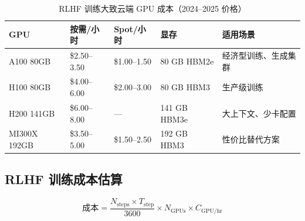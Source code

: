 \begin{table}[ht!]
\centering\small
\caption{RLHF 训练大致云端 GPU 成本（2024--2025 价格）}
\begin{tabularx}{0.88\linewidth}{@{}l Z{1.03} Z{0.95} Z{0.66} Z{1.36}@{}}
\toprule
\textbf{GPU} & \textbf{按需/小时} & \textbf{Spot/小时} & \textbf{显存} & \textbf{适用场景} \\
\midrule
A100 80GB & \$2.50--3.50 & \$1.00--1.50 & 80 GB HBM2e & 经济型训练、生成集群 \\
H100 80GB & \$4.00--6.00 & \$2.00--3.00 & 80 GB HBM3 & 生产级训练 \\
H200 141GB & \$6.00--8.00 & --- & 141 GB HBM3e & 大上下文、少卡配置 \\
MI300X 192GB & \$3.50--5.00 & \$1.50--2.50 & 192 GB HBM3 & 性价比替代方案 \\
\bottomrule
\end{tabularx}
\end{table}

\subsection{RLHF 训练成本估算}
\label{rlhf-training-cost-estimation}

\begin{equation}
\text{成本} = \frac{N_\text{steps} \times T_\text{step}}{3600} \times N_\text{GPUs} \times C_\text{GPU/hr}
\end{equation}

